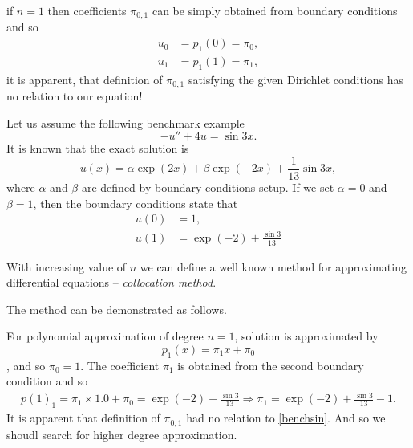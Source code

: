 if $n = 1$ then coefficients $\pi_{0,1}$ can be simply obtained from boundary conditions and so
\begin{equation}
 \begin{split}
  u_{0} &= p_{1}(0) = \pi_{0}, \\
   u_{1} &= p_{1}(1) = \pi_{1},
 \end{split} 
\end{equation}
it is apparent, that definition of $\pi_{0,1}$ satisfying the given Dirichlet conditions has no relation to our equation!

Let us assume the following benchmark example
\begin{equation}
\label{benchsin}
 -u'' + 4u  = \sin 3x.
 \end{equation}
It is known that the exact solution is  
\begin{equation}
u(x) = \alpha \exp(2x) + \beta \exp(-2x)+ \frac{1}{13} \sin 3x,  
\end{equation}
where $\alpha$ and $\beta$ are defined by boundary conditions setup. If 
we set $\alpha = 0$ and $\beta = 1$, then the boundary conditions state 
that
\begin{equation}
\begin{split}
  u(0) &= 1, \\
  u(1) &= \exp(-2) + \frac{\sin 3}{13}
\end{split}
\end{equation}

With increasing value of $n$ we can define a well known method for approximating differential equations -- {\it collocation method}.

The method can be demonstrated as follows.

For polynomial approximation of degree $n=1$, solution is 
approximated by \begin{equation}p_{1}(x) = \pi_{1}x + \pi_{0}\end{equation}, and so $\pi_{0}=1$. 
The coefficient $\pi_{1}$ is obtained from the second boundary 
condition and so
\begin{equation}
\begin{split}
 p(1)_{1} = \pi_{1}\times 1.0 + \pi_{0} = \exp(-2) + \frac{\sin 3}{13} 
 \Rightarrow \pi_{1} = \exp(-2) + \frac{\sin 3}{13}  - 1.
 \end{split}
\end{equation}
It is apparent that definition of $\pi_{0,1}$ had no relation to 
\eqref{benchsin}. And so we shoudl search for higher degree 
approximation.

